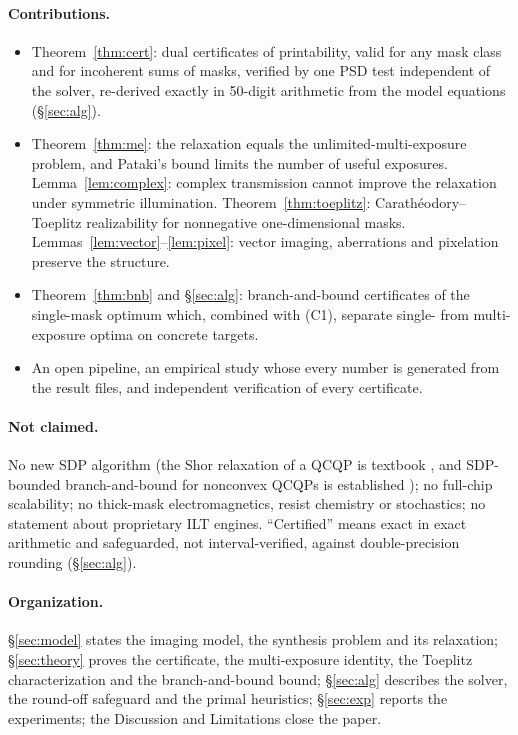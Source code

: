 \documentclass[11pt,a4paper]{article}
\theoremstyle{remark}\newtheorem*{remark}{Remark}
\begin{document}
\paragraph{Contributions.}
\begin{itemize}
\item[(C1)] Theorem~\ref{thm:cert}: dual certificates of printability, valid for any mask class and for incoherent sums of masks, verified by one PSD test independent of the solver, re-derived exactly in 50-digit arithmetic from the model equations (\S\ref{sec:alg}).
\item[(C2)] Theorem~\ref{thm:me}: the relaxation equals the unlimited-multi-exposure problem, and Pataki's bound limits the number of useful exposures. Lemma~\ref{lem:complex}: complex transmission cannot improve the relaxation under symmetric illumination. Theorem~\ref{thm:toeplitz}: Carath\'eodory--Toeplitz realizability for nonnegative one-dimensional masks. Lemmas~\ref{lem:vector}--\ref{lem:pixel}: vector imaging, aberrations and pixelation preserve the structure.
\item[(C3)] Theorem~\ref{thm:bnb} and \S\ref{sec:alg}: branch-and-bound certificates of the single-mask optimum which, combined with (C1), separate single- from multi-exposure optima on concrete targets.
\item[(C4)] An open pipeline, an empirical study whose every number is generated from the result files, and independent verification of every certificate.
\end{itemize}
\paragraph{Not claimed.} No new SDP algorithm (the Shor relaxation of a QCQP is textbook \cite{luo2010,boyd2004}, and SDP-bounded branch-and-bound for nonconvex QCQPs is established \cite{burer2008}); no full-chip scalability; no thick-mask electromagnetics, resist chemistry or stochastics; no statement about proprietary ILT engines. ``Certified'' means exact in exact arithmetic and safeguarded, not interval-verified, against double-precision rounding (\S\ref{sec:alg}).

\paragraph{Organization.} \S\ref{sec:model} states the imaging model, the synthesis problem and its relaxation; \S\ref{sec:theory} proves the certificate, the multi-exposure identity, the Toeplitz characterization and the branch-and-bound bound; \S\ref{sec:alg} describes the solver, the round-off safeguard and the primal heuristics; \S\ref{sec:exp} reports the experiments; the Discussion and Limitations close the paper.
\end{document}
